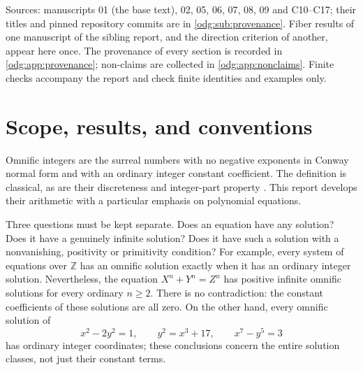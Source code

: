 \documentclass[11pt,oneside]{article}
\numberwithin{equation}{section}
\theoremstyle{definition}
\theoremstyle{remark}
\newcommand{\Z}{\mathbb Z}
\newcommand{\fn}[1]{\nolinkurl{#1}}
\begin{document}
\begin{titlepage}
\begin{minipage}{\textwidth}
\begin{abstract}
This report merges fifteen independently written manuscripts; it states which
source proved each result, prints shared results once, and keeps every
source's limitations. It is an AI-assisted draft: it has not been refereed,
and independent review remains incomplete. Some elementary ring and arithmetic
results have checked Lean proofs; the exact scope is recorded in the
repository's \fn{docs/FORMALIZATION.md}, not inferred from this manuscript.
\end{abstract}
\end{minipage}
\vfill
\begin{minipage}{\textwidth}
\footnotesize
Sources: manuscripts 01 (the base text), 02, 05, 06, 07, 08, 09 and
C10--C17; their titles and pinned repository commits are in
\cref{odg:sub:provenance}.
Fiber results of one manuscript of the sibling report, and the direction
criterion of another, appear here once. The provenance of every
section is recorded in \cref{odg:app:provenance}; non-claims are collected in
\cref{odg:app:nonclaims}. Finite checks accompany the report and check finite
identities and examples only.
\end{minipage}
\end{titlepage}
\hypersetup{pageanchor=true}
\tableofcontents
\newpage

\section{Scope, results, and conventions}\label{odg:sec:scope}

Omnific integers are the surreal numbers with no negative exponents in
Conway normal form and with an ordinary integer constant coefficient.
The definition is classical, as are their discreteness and integer-part
property \cite{Conway,Gonshor,LM}. This report develops their arithmetic
with a particular emphasis on polynomial equations.

Three questions must be kept separate. Does an equation have any solution?
Does it have a genuinely infinite solution? Does it have such a solution
with a nonvanishing, positivity or primitivity condition? For example,
every system of equations over $\Z$ has an omnific solution exactly when it
has an ordinary integer solution. Nevertheless, the equation $X^n+Y^n=Z^n$
has positive infinite omnific solutions for every ordinary $n\geq2$. There
is no contradiction: the constant coefficients of these solutions are all
zero. On the other hand, every omnific solution of
\[
 x^2-2y^2=1,\qquad y^2=x^3+17,\qquad x^7-y^5=3
\]
has ordinary integer coordinates; these conclusions concern the entire
solution classes, not just their constant terms.
\end{document}
